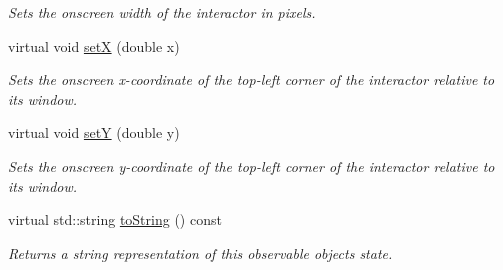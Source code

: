 \begin{DoxyCompactItemize}
\begin{DoxyCompactList}\small\item\em Sets the onscreen width of the interactor in pixels. \end{DoxyCompactList}\item 
virtual void \mbox{\hyperlink{classGInteractor_a9c18fcc579333bf9653d13ad2b372e39}{setX}} (double x)
\begin{DoxyCompactList}\small\item\em Sets the onscreen x-\/coordinate of the top-\/left corner of the interactor relative to its window. \end{DoxyCompactList}\item 
virtual void \mbox{\hyperlink{classGInteractor_a7d57e2a5c35d27feb58fd498a3cf82b9}{setY}} (double y)
\begin{DoxyCompactList}\small\item\em Sets the onscreen y-\/coordinate of the top-\/left corner of the interactor relative to its window. \end{DoxyCompactList}\item 
virtual std\+::string \mbox{\hyperlink{classGObservable_a1fe5121d6528fdea3f243321b3fa3a49}{to\+String}} () const
\begin{DoxyCompactList}\small\item\em Returns a string representation of this observable object\textquotesingle{}s state. \end{DoxyCompactList}\end{DoxyCompactItemize}
